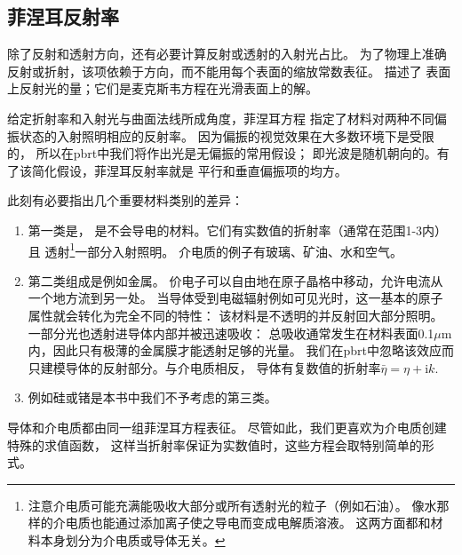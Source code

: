 \subsection{菲涅耳反射率}\label{sub:菲涅耳反射率}
除了反射和透射方向，还有必要计算反射或透射的入射光占比。
为了物理上准确反射或折射，该项依赖于方向，而不能用每个表面的缩放常数表征。
描述了
表面上反射光的量；它们是麦克斯韦方程在光滑表面上的解。

给定折射率和入射光与曲面法线所成角度，菲涅耳方程
指定了材料对两种不同偏振状态的入射照明相应的反射率。
因为偏振的视觉效果在大多数环境下是受限的，
所以在pbrt中我们将作出光是无偏振的常用假设；
即光波是随机朝向的。有了该简化假设，菲涅耳反射率就是
平行和垂直偏振项的均方。

此刻有必要指出几个重要材料类别的差异：
\begin{enumerate}
    \item 第一类是，
          是不会导电的材料。它们有实数值的折射率（通常在范围1-3内）且
          透射\footnote{注意介电质可能充满能吸收大部分或所有透射光的粒子（例如石油）。
              像水那样的介电质也能通过添加离子使之导电而变成电解质溶液。
              这两方面都和材料本身划分为介电质或导体无关。}一部分入射照明。
          介电质的例子有玻璃、矿油、水和空气。
    \item 第二类组成是例如金属。
          价电子可以自由地在原子晶格中移动，允许电流从一个地方流到另一处。
          当导体受到电磁辐射例如可见光时，这一基本的原子属性就会转化为完全不同的特性：
          该材料是不透明的并反射回大部分照明。一部分光也透射进导体内部并被迅速吸收：
          总吸收通常发生在材料表面0.1$\mu\mathrm{m}$内，因此只有极薄的金属膜才能透射足够的光量。
          我们在pbrt中忽略该效应而只建模导体的反射部分。与介电质相反，
          导体有复数值的折射率$\bar{\eta}=\eta+\mathrm{i}k$.
    \item {}例如硅或锗是本书中我们不予考虑的第三类。
\end{enumerate}

导体和介电质都由同一组菲涅耳方程表征。
尽管如此，我们更喜欢为介电质创建特殊的求值函数，
这样当折射率保证为实数值时，这些方程会取特别简单的形式。

